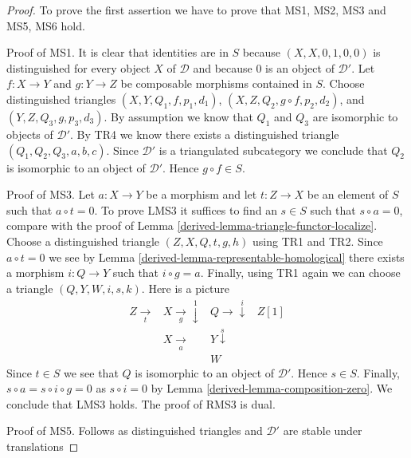 \begin{proof}

To prove the first assertion we have to prove that
MS1, MS2, MS3 and MS5, MS6 hold.

\medskip\noindent
Proof of MS1. It is clear that identities are in $S$ because
$(X, X, 0, 1, 0, 0)$ is distinguished for every object $X$ of $\mathcal{D}$
and because $0$ is an object of $\mathcal{D}'$. Let $f : X \to Y$
and $g : Y \to Z$ be composable morphisms contained in $S$.
Choose distinguished triangles $(X, Y, Q_1, f, p_1, d_1)$,
$(X, Z, Q_2, g \circ f, p_2, d_2)$, and $(Y, Z, Q_3, g, p_3, d_3)$.
By assumption we know that $Q_1$ and $Q_3$ are isomorphic to objects
of $\mathcal{D}'$. By TR4 we know there exists a distinguished
triangle $(Q_1, Q_2, Q_3, a, b, c)$. Since $\mathcal{D}'$ is a
triangulated subcategory we conclude that $Q_2$ is isomorphic to
an object of $\mathcal{D}'$. Hence $g \circ f \in S$.

\medskip\noindent
Proof of MS3. Let $a : X \to Y$ be a morphism and let $t : Z \to X$ be
an element of $S$ such that $a \circ t = 0$. To prove LMS3 it suffices to
find an $s \in S$ such that $s \circ a = 0$, compare with the proof of
Lemma \ref{derived-lemma-triangle-functor-localize}. Choose a distinguished
triangle $(Z, X, Q, t, g, h)$ using TR1 and TR2. Since $a \circ t = 0$
we see by
Lemma \ref{derived-lemma-representable-homological}
there exists a morphism $i : Q \to Y$ such that $i \circ g = a$.
Finally, using TR1 again we can choose a triangle
$(Q, Y, W, i, s, k)$. Here is a picture
$$
\begin{array}{cccc}Z \underset{t}{\longrightarrow} & X \underset{g}{\longrightarrow}\overset{1}{\downarrow} & Q \longrightarrow\overset{i}{\downarrow} & Z[1] \\  & X \underset{a}{\longrightarrow} & Y \overset{s}{\downarrow} &  \\  &  & W & \end{array}
$$
Since $t \in S$ we see that $Q$ is isomorphic to an object of $\mathcal{D}'$.
Hence $s \in S$. Finally, $s \circ a = s \circ i \circ g = 0$ as
$s \circ i = 0$ by Lemma \ref{derived-lemma-composition-zero}.
We conclude that LMS3 holds.
The proof of RMS3 is dual.

\medskip\noindent
Proof of MS5. Follows as distinguished triangles and $\mathcal{D}'$
are stable under translations


\end{proof}
